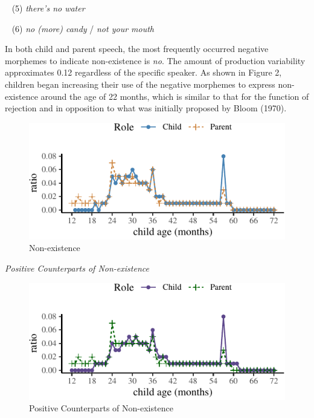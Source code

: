 \documentclass[
  english,
  man,floatsintext]{apa6}
\begin{document}
~
(5) \emph{there's no water}

~
(6) \emph{no (more) candy} / \emph{not your mouth}

In both child and parent speech, the most frequently occurred negative morphemes to indicate non-existence is \emph{no}. The amount of production variability approximates 0.12 regardless of the specific speaker. As shown in Figure 2, children began increasing their use of the negative morphemes to express non-existence around the age of 22 months, which is similar to that for the function of rejection and in opposition to what was initially proposed by Bloom (1970).

\begin{figure}[H]

{\centering \includegraphics{neg_combos_full_files/figure-latex/existence-1} 

}

\caption{Non-existence}\label{fig:existence}
\end{figure}

\emph{Positive Counterparts of Non-existence}

\begin{figure}[H]

{\centering \includegraphics{neg_combos_full_files/figure-latex/posexistence-1} 

}

\caption{Positive Counterparts of Non-existence}\label{fig:posexistence}
\end{figure}
\end{document}

